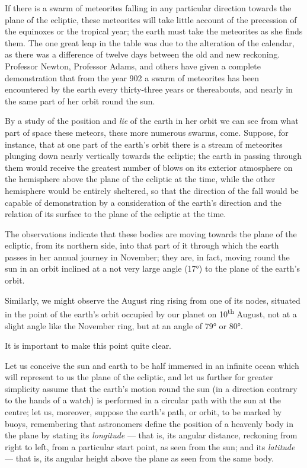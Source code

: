 \documentclass[a4paper, 12pt, oneside, polutonikogreek, english]{article}
\begin{document}
If there is a swarm of meteorites falling in any particular direction towards the plane of the ecliptic, these meteorites will take little account of the precession of the equinoxes or the tropical year; the earth must take the meteorites as she finds them. The one great leap in the table was due to the alteration of the calendar, as there was a difference of twelve days between the old and new reckoning. Professor Newton, Professor Adams, and others have given a complete demonstration that from the year 902 a swarm of meteorites has been encountered by the earth every thirty-three years or thereabouts, and nearly in the same part of her orbit round the sun.

By a study of the position and \emph{lie} of the earth in her orbit we can see from what part of space these meteors, these more numerous swarms, come. Suppose, for instance, that at one part of the earth's orbit there is a stream of meteorites plunging down nearly vertically towards the ecliptic; the earth in passing through them would receive the greatest number of blows on its exterior atmosphere on the hemisphere above the plane of the ecliptic at the time, while the other hemisphere would be entirely sheltered, so that the direction of the fall would be capable of demonstration by a consideration of the earth's direction and the relation of its surface to the plane of the ecliptic at the time.

The observations indicate that these bodies are moving towards the plane of the ecliptic, from its northern side, into that part of it through which the earth passes in her annual journey in November; they are, in fact, moving round the sun in an orbit inclined at a not very large angle (17°) to the plane of the earth's orbit.

Similarly, we might observe the August ring rising from one of its nodes, situated in the point of the earth's orbit occupied by our planet on 10\textsuperscript{th} August, not at a slight angle like the November ring, but at an angle of 79° or 80°.

It is important to make this point quite clear.

Let us conceive the sun and earth to be half immersed in an infinite ocean which will represent to us the plane of the ecliptic, and let us further for greater simplicity assume that the earth's motion round the sun (in a direction contrary to the hands of a watch) is performed in a circular path with the sun at the centre; let us, moreover, suppose the earth's path, or orbit, to be marked by buoys, remembering that astronomers define the position of a heavenly body in the plane by stating its \emph{longitude} --- that is, its angular distance, reckoning from right to left, from a particular start point, as seen from the sun; and its \emph{latitude} --- that is, its angular height above the plane as seen from the same body.
\end{document}
